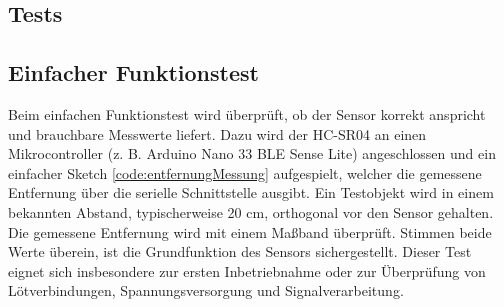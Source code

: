 \begin{code}[H]
	\caption{Einfache Anwendung als Schwellenwert-Melder}
	\label{code:schwellenwert}
\end{code}

\subsection{Tests}
\subsection*{Einfacher Funktionstest}
Beim einfachen Funktionstest wird überprüft, ob der Sensor korrekt anspricht und brauchbare
Messwerte liefert. Dazu wird der HC-SR04 an einen Mikrocontroller (z. B. Arduino Nano 33 BLE
Sense Lite) angeschlossen und ein einfacher Sketch  \ref{code:entfernungMessung} aufgespielt, welcher die gemessene
Entfernung über die serielle Schnittstelle ausgibt. \cite{Hering:2023}
Ein Testobjekt wird in einem bekannten Abstand, typischerweise 20 cm, orthogonal vor den
Sensor gehalten. Die gemessene Entfernung wird mit einem Maßband überprüft. Stimmen beide
Werte überein, ist die Grundfunktion des Sensors sichergestellt. Dieser Test eignet sich
insbesondere zur ersten Inbetriebnahme oder zur Überprüfung von Lötverbindungen,
Spannungsversorgung und Signalverarbeitung.

\begin{code}[H]
	\caption{Code für die Messung einer Strecke}
	\label{code:entfernungMessung}
\end{code}

